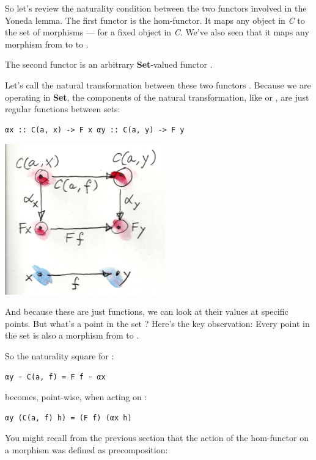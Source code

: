 So let's review the naturality condition between the two functors
involved in the Yoneda lemma. The first functor is the hom-functor. It
maps any object  in \emph{C} to the set of morphisms
 --- for  a fixed object in \emph{C}. We've
also seen that it maps any morphism  from  to
 to .

The second functor is an arbitrary \textbf{Set}-valued functor
.

Let's call the natural transformation between these two functors
. Because we are operating in \textbf{Set}, the components of
the natural transformation, like  or , are just
regular functions between sets:

\begin{verbatim}
αx :: C(a, x) -> F x αy :: C(a, y) -> F y
\end{verbatim}

\includegraphics[width=2.73958in]{images/yoneda1.png}

And because these are just functions, we can look at their values at
specific points. But what's a point in the set ? Here's
the key observation: Every point in the set  is also a
morphism  from  to .

So the naturality square for :

\begin{verbatim}
αy ◦ C(a, f) = F f ◦ αx
\end{verbatim}

becomes, point-wise, when acting on :

\begin{verbatim}
αy (C(a, f) h) = (F f) (αx h)
\end{verbatim}

You might recall from the previous section that the action of the
hom-functor  on a morphism  was defined as
precomposition:


